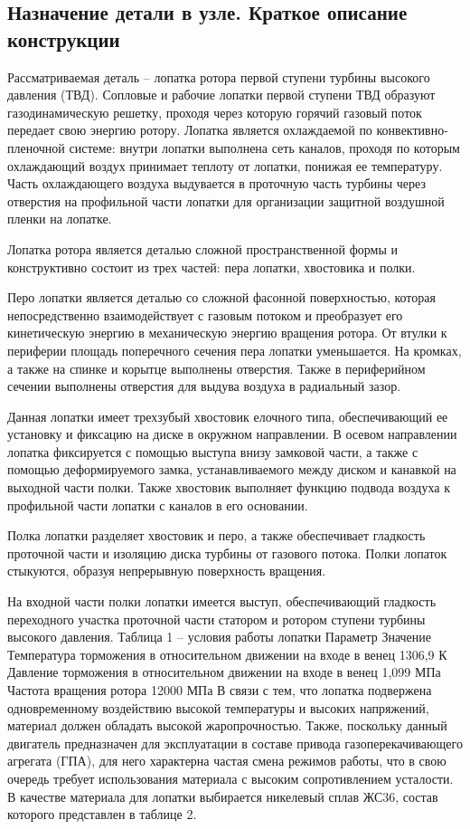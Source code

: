 \subsection{Назначение детали в узле. Краткое описание конструкции}
Рассматриваемая деталь – лопатка ротора первой ступени турбины высокого давления (ТВД). Сопловые и рабочие лопатки первой
ступени ТВД образуют газодинамическую решетку, проходя через которую горячий газовый поток передает свою энергию ротору.
Лопатка является охлаждаемой по конвективно-пленочной системе: внутри лопатки выполнена сеть каналов, проходя по которым
охлаждающий воздух принимает теплоту от лопатки, понижая ее температуру. Часть охлаждающего воздуха выдувается в проточную
часть турбины через отверстия на профильной части лопатки для организации защитной воздушной пленки на лопатке.

Лопатка ротора является деталью сложной пространственной формы и конструктивно состоит из трех частей: пера лопатки, хвостовика и полки.

Перо лопатки является деталью со сложной фасонной поверхностью, которая непосредственно взаимодействует с газовым потоком
и преобразует его кинетическую энергию в механическую энергию вращения ротора. От втулки к периферии площадь поперечного
сечения пера лопатки уменьшается. На кромках, а также на спинке и корытце выполнены отверстия. Также в периферийном сечении
выполнены отверстия для выдува воздуха в радиальный зазор.

Данная лопатки имеет трехзубый хвостовик елочного типа, обеспечивающий ее установку и фиксацию на диске в окружном направлении.
В осевом направлении лопатка фиксируется с помощью выступа внизу замковой части, а также с помощью деформируемого замка,
устанавливаемого между диском и канавкой на выходной части полки. Также хвостовик выполняет функцию подвода воздуха к
профильной части лопатки с каналов в его основании.

Полка лопатки разделяет хвостовик и перо, а также обеспечивает гладкость проточной части и изоляцию диска турбины от газового
потока. Полки лопаток стыкуются, образуя непрерывную поверхность вращения.

На входной части полки лопатки имеется выступ, обеспечивающий гладкость переходного участка проточной части статором и
ротором ступени турбины высокого давления.
Таблица 1 – условия работы лопатки
Параметр
Значение
Температура торможения в относительном движении на входе в венец
1306,9 К
Давление торможения в относительном движении на входе в венец
1,099 МПа
Частота вращения ротора
12000 МПа
В связи с тем, что лопатка подвержена одновременному воздействию высокой температуры и высоких напряжений, материал должен обладать высокой жаропрочностью. Также, поскольку данный двигатель предназначен для эксплуатации в составе привода газоперекачивающего агрегата (ГПА), для него характерна частая смена режимов работы, что в свою очередь требует использования материала с высоким сопротивлением усталости.
В качестве материала для лопатки выбирается никелевый сплав ЖС36, состав которого представлен в таблице 2.









